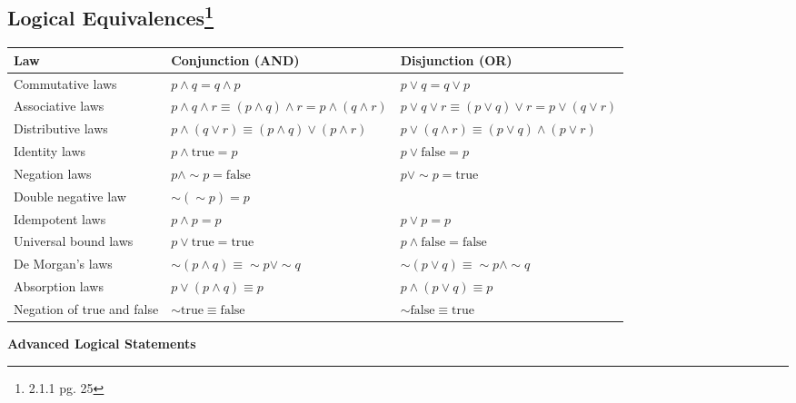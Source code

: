 \documentclass{article}
\begin{document}
\subsection[Logical Equivalences]{Logical Equivalences\footnote{2.1.1 pg. 25}}
\begin{table}[ht]
    \centering
    \begin{tabular}{|>{\raggedright}m{4cm}|>{\centering\arraybackslash}m{4cm}|>{\centering\arraybackslash}m{4cm}|}
        \hline
        \textbf{Law} & \textbf{Conjunction (AND)} & \textbf{Disjunction (OR)} \\ \hline
        Commutative laws & \( p \land q = q \land p \) & \( p \lor q = q \lor p \) \\ \hline
        Associative laws & \( p \land q \land r \equiv (p \land q) \land r = p \land (q \land r) \) & \( p \lor q \lor r \equiv (p \lor q) \lor r = p \lor (q \lor r) \) \\ \hline
        Distributive laws & \( p \land (q \lor r) \equiv (p \land q) \lor (p \land r) \) & \( p \lor (q \land r) \equiv (p \lor q) \land (p \lor r) \) \\ \hline
        Identity laws & \( p \land \text{true} = p \) & \( p \lor \text{false} = p \) \\ \hline
        Negation laws & \( p \land \sim p = \text{false} \) & \( p \lor \sim p = \text{true} \) \\ \hline
        Double negative law & \( \sim(\sim p) = p \) &  \\ \hline
        Idempotent laws & \( p \land p = p \) & \( p \lor p = p \) \\ \hline
        Universal bound laws & \( p \lor \text{true} = \text{true} \) & \( p \land \text{false} = \text{false} \) \\ \hline
        De Morgan’s laws & \( \sim(p \land q) \equiv \sim p \lor \sim q \) & \( \sim(p \lor q) \equiv \sim p \land \sim q \) \\ \hline
        Absorption laws & \( p \lor (p \land q) \equiv p \) & \( p \land (p \lor q) \equiv p \) \\ \hline
        Negation of true and false & \( \sim \text{true} \equiv \text{false} \) & \( \sim \text{false} \equiv \text{true} \) \\ \hline
    \end{tabular}
\end{table}

\vspace{10pt}

\textbf{Advanced Logical Statements}
\end{document}
